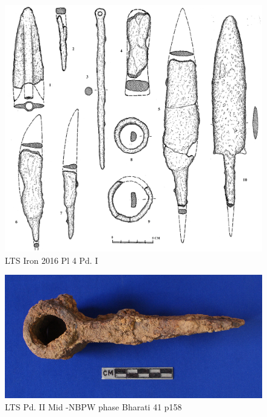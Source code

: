 \begin{figure}[H]
\includegraphics[scale=0.4]{images/chapter-4/fig012.jpg}
\caption{LTS Iron 2016 Pl 4 Pd. I}\label{chapter-4-fig12}
\end{figure}

\begin{figure}[H]
\renewcommand{\thefigure}{13A}
\includegraphics[scale=0.4]{images/chapter-4/fig013A.jpg}
\caption{LTS Pd. II Mid -NBPW phase Bharati 41 p158}\label{chapter-4-fig13A}
\end{figure}

